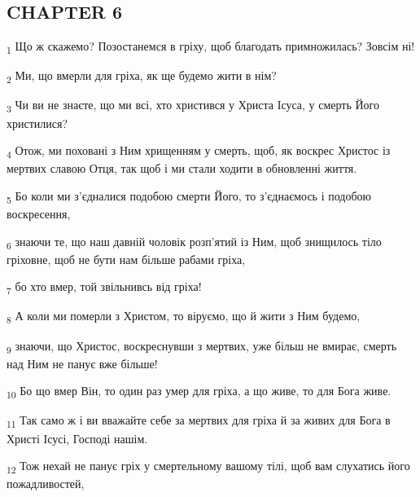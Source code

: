 \subsection{CHAPTER 6}
\begin{tcolorbox}
\textsubscript{1} Що ж скажемо? Позостанемся в гріху, щоб благодать примножилась? Зовсім ні!
\end{tcolorbox}
\begin{tcolorbox}
\textsubscript{2} Ми, що вмерли для гріха, як ще будемо жити в нім?
\end{tcolorbox}
\begin{tcolorbox}
\textsubscript{3} Чи ви не знаєте, що ми всі, хто христився у Христа Ісуса, у смерть Його христилися?
\end{tcolorbox}
\begin{tcolorbox}
\textsubscript{4} Отож, ми поховані з Ним хрищенням у смерть, щоб, як воскрес Христос із мертвих славою Отця, так щоб і ми стали ходити в обновленні життя.
\end{tcolorbox}
\begin{tcolorbox}
\textsubscript{5} Бо коли ми з'єдналися подобою смерти Його, то з'єднаємось і подобою воскресення,
\end{tcolorbox}
\begin{tcolorbox}
\textsubscript{6} знаючи те, що наш давній чоловік розп'ятий із Ним, щоб знищилось тіло гріховне, щоб не бути нам більше рабами гріха,
\end{tcolorbox}
\begin{tcolorbox}
\textsubscript{7} бо хто вмер, той звільнивсь від гріха!
\end{tcolorbox}
\begin{tcolorbox}
\textsubscript{8} А коли ми померли з Христом, то віруємо, що й жити з Ним будемо,
\end{tcolorbox}
\begin{tcolorbox}
\textsubscript{9} знаючи, що Христос, воскреснувши з мертвих, уже більш не вмирає, смерть над Ним не панує вже більше!
\end{tcolorbox}
\begin{tcolorbox}
\textsubscript{10} Бо що вмер Він, то один раз умер для гріха, а що живе, то для Бога живе.
\end{tcolorbox}
\begin{tcolorbox}
\textsubscript{11} Так само ж і ви вважайте себе за мертвих для гріха й за живих для Бога в Христі Ісусі, Господі нашім.
\end{tcolorbox}
\begin{tcolorbox}
\textsubscript{12} Тож нехай не панує гріх у смертельному вашому тілі, щоб вам слухатись його пожадливостей,
\end{tcolorbox}
